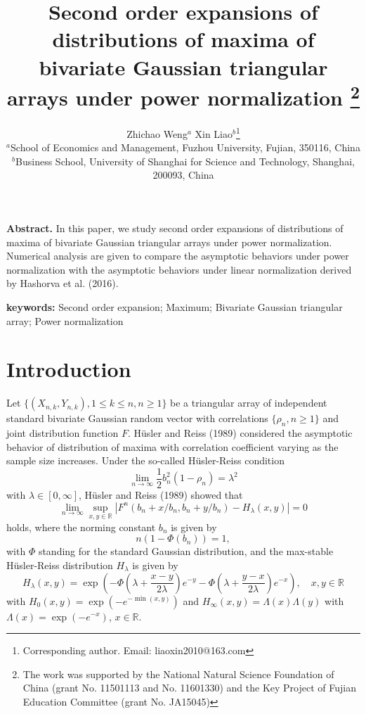 \documentclass[10pt,twosided]{article}
\numberwithin{equation}{section}
\numberwithin{equation}{section}
\newcommand{\R}{\mathbb{R}}
\newcommand{\inr}{\in \R}
\begin{document}
\title{Second order expansions of distributions of maxima of bivariate Gaussian triangular arrays under power
normalization
\thanks{The work was supported by the National Natural Science Foundation of China (grant No. 11501113 and No. 11601330) and the Key Project of Fujian
Education Committee (grant No. JA15045)}}
\author{Zhichao Weng$^a$ \qquad Xin Liao$^b$\thanks{Corresponding author. Email: liaoxin2010@163.com}
\\{\small $^a$School of Economics and Management, Fuzhou University, Fujian, 350116, China}\\
{\small $^b$Business School, University of Shanghai for Science and Technology, Shanghai, 200093, China}}


\maketitle


{\bf Abstract.} In this paper, we study second order expansions of distributions of maxima of bivariate Gaussian triangular arrays under power normalization. Numerical
analysis are given to compare the asymptotic behaviors under power normalization with the asymptotic behaviors under linear normalization derived by Hashorva et al. (2016).


{\bf keywords:} Second order expansion; Maximum; Bivariate Gaussian triangular array; Power normalization




\section{Introduction}\label{sec1}
 Let $\{(X_{n,k},Y_{n,k}), 1\le k\le n, n\ge 1\}$ be a
triangular array of independent standard bivariate Gaussian random
vector with correlations $\{\rho_n,n\ge 1\}$ and joint distribution
function $F$. H\"{u}sler and Reiss (1989) considered the asymptotic
behavior of distribution of maxima with correlation coefficient
varying as the sample size increases. Under the so-called
H\"{u}sler-Reiss condition
\begin{equation}\label{eq1.3}
\lim_{n\to \infty}\frac{1}{2}b_n^2(1-\rho_n)=\lambda^2
\end{equation}
with $\lambda\in [0,\infty]$, H\"{u}sler and Reiss (1989) showed that
$$\lim_{n\to \infty}\sup_{x,y\inr}|F^n(b_n+x/b_n,b_n+y/b_n)-H_{\lambda}(x,y)|=0$$
holds, where the norming constant $b_n$ is given by
\begin{equation}\label{eq1.2}
n(1-\Phi(b_n))=1,
\end{equation}
with $\Phi$ standing for the standard Gaussian distribution, and the
max-stable H\"{u}sler-Reiss distribution $H_{\lambda}$ is given by
$$H_{\lambda}(x,y)=\exp\left(-\Phi(\lambda+\frac{x-y}{2\lambda})e^{-y}-\Phi(\lambda+\frac{y-x}{2\lambda})e^{-x}\right), \quad x,y\inr$$
with $H_0(x,y)=\exp\left(-e^{-\min(x,y)}\right)$ and
$H_{\infty}(x,y)=\Lambda(x)\Lambda(y)$  with
$\Lambda(x)=\exp\left(-e^{-x}\right)$, $x\inr$.
\end{document}
